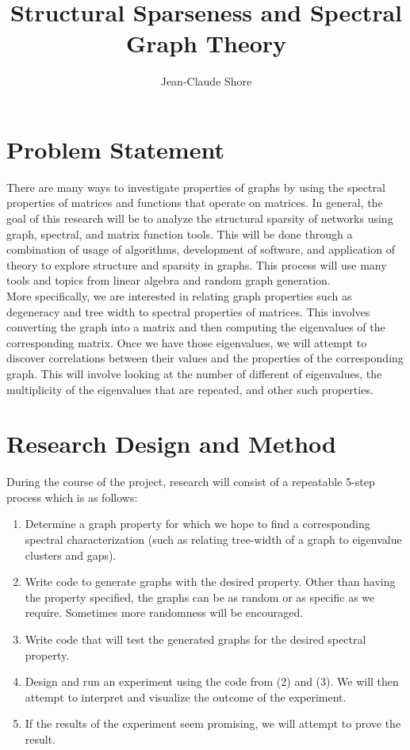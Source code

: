\documentclass[a4paper,10pt]{article}
\title{Structural Sparseness and Spectral Graph Theory}
\author{Jean-Claude Shore}
\begin{document}
	\maketitle
	\section{Problem Statement}
	
	There are many ways to investigate properties of graphs by using the spectral properties of matrices and functions that operate on matrices.  In general, the goal of this research will be to analyze the structural sparsity of networks using graph, spectral, and matrix function tools.  This will be done through a combination of usage of algorithms, development of software, and application of theory to explore structure and sparsity in graphs.  This process will use many tools and topics from linear algebra and random graph generation.\\ 
	
	More specifically, we are interested in relating graph properties such as degeneracy and tree width to spectral properties of matrices.  This involves converting the graph into a matrix and then computing the eigenvalues of the corresponding matrix.  Once we have those eigenvalues, we will attempt to discover correlations between their values and the properties of the corresponding graph.  This will involve looking at the number of different of eigenvalues, the multiplicity of the eigenvalues that are repeated, and other such properties.  
	
	\section{Research Design and Method}
	
	During the course of the project, research will consist of a repeatable 5-step process which is as follows:
	\begin{enumerate}
		\item Determine a graph property for which we hope to find a corresponding spectral characterization (such as relating tree-width of a graph to eigenvalue clusters and gaps).
		\item Write code to generate graphs with the desired property.  Other than having the property specified, the graphs can be as random or as specific as we require.  Sometimes more randomness will be encouraged.
		\item Write code that will test the generated graphs for the desired spectral property.
		\item Design and run an experiment using the code from (2) and (3).  We will then attempt to interpret and visualize the outcome of the experiment.
		\item If the results of the experiment seem promising, we will attempt to prove the result.
	\end{enumerate}
\end{document}
